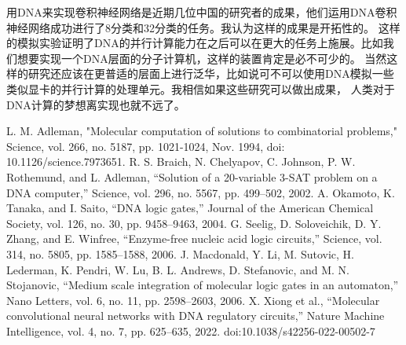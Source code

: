 \documentclass[a4paper,twoside]{article}
\begin{document}
用DNA来实现卷积神经网络是近期几位中国的研究者的成果，他们运用DNA卷积神经网络成功进行了8分类和32分类的任务。我认为这样的成果是开拓性的。
这样的模拟实验证明了DNA的并行计算能力在之后可以在更大的任务上施展。比如我们想要实现一个DNA层面的分子计算机，这样的装置肯定是必不可少的。
当然这样的研究还应该在更普适的层面上进行泛华，比如说可不可以使用DNA模拟一些类似显卡的并行计算的处理单元。我相信如果这些研究可以做出成果，
人类对于DNA计算的梦想离实现也就不远了。
\newpage
\begin{thebibliography}{10}
	 L. M. Adleman, "Molecular computation of solutions to combinatorial problems," Science, vol. 266, no. 5187, pp. 1021-1024, Nov. 1994, doi: 10.1126/science.7973651.
	  R. S. Braich, N. Chelyapov, C. Johnson, P. W. Rothemund, and L. Adleman, “Solution of a 20-variable 3-SAT problem on a DNA computer,” Science, vol. 296, no. 5567, pp. 499–502, 2002.
	 A. Okamoto, K. Tanaka, and I. Saito, “DNA logic gates,” Journal of the American Chemical Society, vol. 126, no. 30, pp. 9458–9463, 2004.
	 G. Seelig, D. Soloveichik, D. Y. Zhang, and E. Winfree, “Enzyme-free nucleic acid logic circuits,” Science, vol. 314, no. 5805, pp. 1585–1588, 2006.
	 J. Macdonald, Y. Li, M. Sutovic, H. Lederman, K. Pendri, W. Lu, B. L. Andrews, D. Stefanovic, and M. N. Stojanovic, “Medium scale integration of molecular logic gates in an automaton,” Nano Letters, vol. 6, no. 11, pp. 2598–2603, 2006.
	 X. Xiong et al., “Molecular convolutional neural networks with DNA regulatory circuits,” Nature Machine Intelligence, vol. 4, no. 7, pp. 625–635, 2022. doi:10.1038/s42256-022-00502-7
\end{thebibliography}
\end{document}
